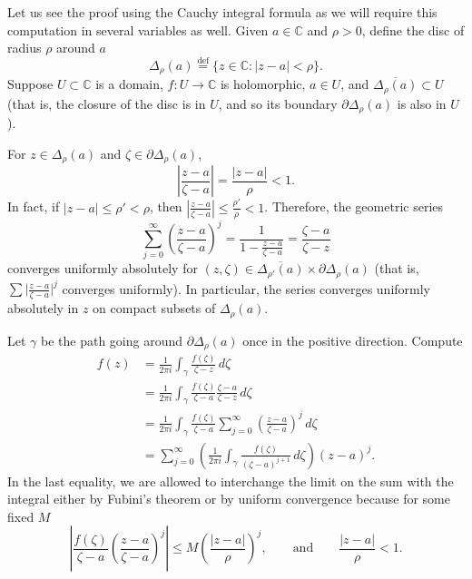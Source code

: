 \documentclass[12pt,openany]{book}
\newcommand{\sabs}[1]{\lvert {#1} \rvert}
\newcommand{\abs}[1]{\left\lvert {#1} \right\rvert}
\newcommand{\C}{{\mathbb{C}}}
\theoremstyle{plain}
\theoremstyle{remark}
\theoremstyle{definition}
\theoremstyle{exercise}
\theoremstyle{example}
\begin{document}
Let us see the proof using the Cauchy integral formula as we will
require this computation in several variables as well.
Given $a \in \C$ and $\rho > 0$, define the disc of radius $\rho$ around $a$
\begin{equation*}
\Delta_\rho(a)
\overset{\text{def}}{=}
\bigl\{ z \in \C : \sabs{z-a} < \rho \bigr\} .
\end{equation*}
Suppose $U \subset \C$ is a domain, $f \colon U \to \C$ is holomorphic,
$a \in U$, and $\overline{\Delta_\rho(a)} \subset U$ (that is, the closure
of the disc is in $U$, and so its boundary $\partial \Delta_\rho(a)$ is also in $U$).

For $z \in \Delta_\rho(a)$ and $\zeta \in \partial \Delta_\rho(a)$, 
\begin{equation*}
\abs{\frac{z-a}{\zeta-a}} =
\frac{\sabs{z-a}}{\rho} < 1 .
\end{equation*}
In fact, if $\sabs{z-a} \leq \rho' < \rho$, then
$\abs{\frac{z-a}{\zeta-a}} \leq \frac{\rho'}{\rho} < 1$.  Therefore,
the geometric series
\begin{equation*}
\sum_{j=0}^\infty
{\left(\frac{z-a}{\zeta-a}\right)}^j
=
\frac{1}{1-
\frac{z-a}{\zeta-a}}
=
\frac{\zeta-a}{\zeta-z}
\end{equation*}
converges uniformly absolutely for $(z,\zeta) \in \overline{\Delta_{\rho'}(a)}
\times \partial \Delta_\rho(a)$ (that is, $\sum {\bigl\lvert
\frac{z-a}{\zeta-a} \bigr\rvert}^j$
converges uniformly).  In particular, the
series converges uniformly absolutely in $z$ on compact subsets of $\Delta_{\rho}(a)$. 

Let $\gamma$
be the path going around 
$\partial \Delta_\rho(a)$ once in the positive direction.  Compute
\begin{equation*}
\begin{split}
f(z)
& =
\frac{1}{2\pi i}
\int_{\gamma}
\frac{f(\zeta)}{\zeta-z}
\,
d \zeta 
\\
& =
\frac{1}{2\pi i}
\int_{\gamma}
\frac{f(\zeta)}{\zeta-a}
\frac{\zeta-a}{\zeta-z}
\,
d \zeta 
\\
& =
\frac{1}{2\pi i}
\int_{\gamma}
\frac{f(\zeta)}{\zeta-a}
\sum_{j=0}^\infty
{\left(\frac{z-a}{\zeta-a}\right)}^j
\,
d \zeta 
\\
& =
\sum_{j=0}^\infty
\left(
\frac{1}{2\pi i}
\int_{\gamma}
\frac{f(\zeta)}{{(\zeta-a)}^{j+1}}
\,
d \zeta 
\right)
{(z-a)}^j .
\end{split}
\end{equation*}
In the last equality, we are allowed to 
interchange the limit on the sum with the integral either
by Fubini's theorem or by uniform convergence because
for some fixed $M$
\begin{equation*}
\abs{
\frac{f(\zeta)}{\zeta-a}
{\left(\frac{z-a}{\zeta-a}\right)}^j
}
\leq
M 
{\left(\frac{\abs{z-a}}{\rho}\right)}^j,
\qquad \text{and} \qquad
\frac{\abs{z-a}}{\rho} < 1 .
\end{equation*}
\end{document}
